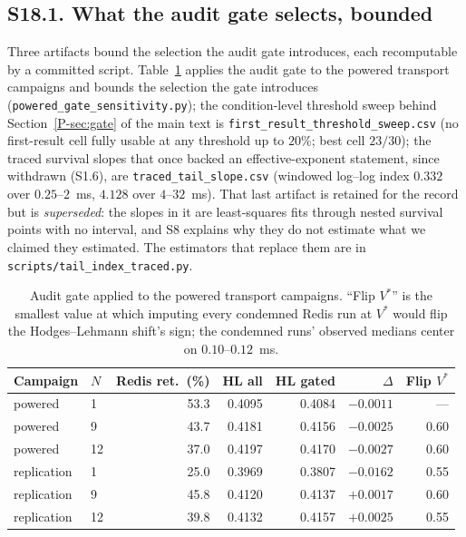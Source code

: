 \documentclass[10pt,journal,onecolumn]{IEEEtran}
\newcommand{\redis}{Redis}
\newcommand{\mainGate}{\ref{P-sec:gate}}            %
\begin{document}
\subsection{S18.1. What the audit gate selects, bounded}
Three artifacts bound the selection the audit gate introduces, each recomputable by a
committed script.
Table~\ref{tab:gatesens} applies the audit gate to the powered transport campaigns and
bounds the selection the gate introduces (\texttt{powered\_gate\_sensitivity.py}); the
condition-level threshold sweep behind Section~\mainGate{} of the main text is
\texttt{first\_result\_threshold\_sweep.csv} (no first-result cell fully usable at any
threshold up to $20\%$; best cell $23/30$); the traced survival slopes that once backed an effective-exponent statement, since withdrawn (S1.6), are \texttt{traced\_tail\_slope.csv} (windowed
log--log index $0.332$ over $0.25$--$2$~ms, $4.128$ over $4$--$32$~ms). That last artifact
is retained for the record but is \emph{superseded}: the slopes in it are least-squares fits
through nested survival points with no interval, and S8 explains why they do not estimate
what we claimed they estimated. The estimators that replace them are in
\texttt{scripts/tail\_index\_traced.py}.

\begin{table}[t]
\caption[Audit gate applied to the powered transport campaigns]{Audit gate applied to the powered transport campaigns. ``Flip $V^*$'' is the
smallest value at which imputing every condemned \redis{} run at $V^*$ would flip the
Hodges--Lehmann shift's sign; the condemned runs' observed medians center on
$0.10$--$0.12$~ms.}
\label{tab:gatesens}
\centering
\small
\begin{tabular}{llrrrrr}
\toprule
Campaign & $N$ & \redis{} ret.\ (\%) & HL all & HL gated & $\Delta$ & Flip $V^*$ \\
\midrule
powered     & 1  & 53.3 & 0.4095 & 0.4084 & $-0.0011$ & --- \\
powered     & 9  & 43.7 & 0.4181 & 0.4156 & $-0.0025$ & 0.60 \\
powered     & 12 & 37.0 & 0.4197 & 0.4170 & $-0.0027$ & 0.60 \\
replication & 1  & 25.0 & 0.3969 & 0.3807 & $-0.0162$ & 0.55 \\
replication & 9  & 45.8 & 0.4120 & 0.4137 & $+0.0017$ & 0.60 \\
replication & 12 & 39.8 & 0.4132 & 0.4157 & $+0.0025$ & 0.55 \\
\bottomrule
\end{tabular}
\end{table}
\end{document}
